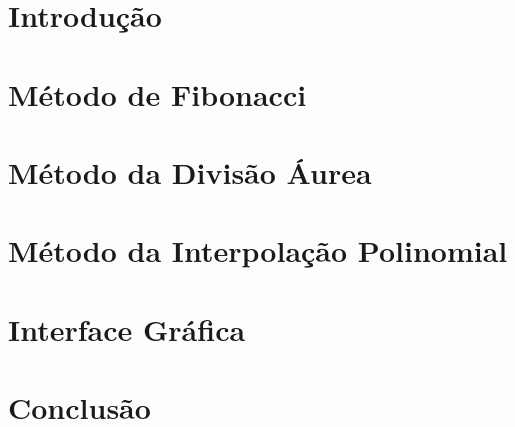 \documentclass{article}
\begin{document}
\large


\tableofcontents

\newpage

\section{Introdução}



\section{Método de Fibonacci}



\section{Método da Divisão Áurea}



\section{Método da Interpolação Polinomial}



\section{Interface Gráfica}



\section{Conclusão}


	
\end{document}
